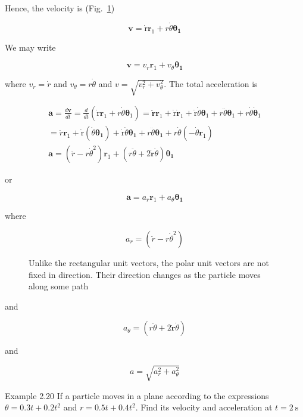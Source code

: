 \documentclass[10pt]{article}
\numberwithin{equation}{section}
\begin{document}
Hence, the velocity is (Fig.~\ref{fig:2-31})


\begin{equation}
\mathbf{v}=\dot{\mathrm{r}} \mathbf{r}_{1}+r \dot{\theta} \boldsymbol{\theta}_{\mathbf{1}} \label{eq:2-21}
\end{equation}


We may write

$$
\mathbf{v}=v_{r} \mathbf{r}_{1}+v_{\theta} \boldsymbol{\theta}_{\mathbf{1}}
$$

where $v_{r}=\dot{r}$ and $v_{\theta}=r \dot{\theta}$ and $v=\sqrt{v_{r}^{2}+v_{\theta}^{2}}$. The total acceleration is


\begin{gather}
\mathbf{a}=\frac{d \mathbf{v}}{d t}=\frac{d}{d t}\left(\dot{\mathrm{r}} \mathbf{r}_{1}+r \dot{\theta} \boldsymbol{\theta}_{1}\right)=\ddot{\boldsymbol{r}} \mathbf{r}_{1}+\dot{\mathrm{r}} \dot{\mathbf{r}}_{1}+\dot{\mathrm{r}} \dot{\theta} \boldsymbol{\theta}_{1}+r \ddot{\theta} \boldsymbol{\theta}_{1}+r \dot{\theta} \dot{\boldsymbol{\theta}}_{1} \\
=\ddot{r} \mathbf{r}_{1}+\dot{\mathrm{r}}\left(\dot{\theta} \boldsymbol{\theta}_{\mathbf{1}}\right)+\dot{\mathrm{r}} \dot{\theta} \boldsymbol{\theta}_{\mathbf{1}}+r \ddot{\theta} \boldsymbol{\theta}_{\mathbf{1}}+r \dot{\theta}\left(-\dot{\theta} \mathbf{r}_{1}\right) \\
\mathbf{a}=\left(\ddot{r}-r \dot{\theta}^{2}\right) \mathbf{r}_{1}+(r \ddot{\theta}+2 \dot{\mathbf{r}} \dot{\theta}) \boldsymbol{\theta}_{\mathbf{1}} \label{eq:2-22}
\end{gather}


or

$$
\mathbf{a}=a_{r} \mathbf{r}_{1}+a_{\theta} \boldsymbol{\theta}_{\mathbf{1}}
$$

where

$$
a_{r}=\left(\ddot{r}-r \dot{\theta}^{2}\right)
$$

\begin{figure}[htbp]
\caption{Unlike the rectangular unit vectors, the polar unit vectors are not fixed in direction. Their direction changes as the particle moves along some path}\label{fig:2-31}
\end{figure}
and

$$
a_{\theta}=(r \ddot{\theta}+2 \dot{\mathbf{r}} \dot{\theta})
$$

and

$$
a=\sqrt{a_{r}^{2}+a_{\theta}^{2}}
$$

Example 2.20 If a particle moves in a plane according to the expressions $\theta=0.3 t+0.2 t^{2}$ and $r=0.5 t+0.4 t^{2}$. Find its velocity and acceleration at $t=2 \mathrm{~s}$
\end{document}
